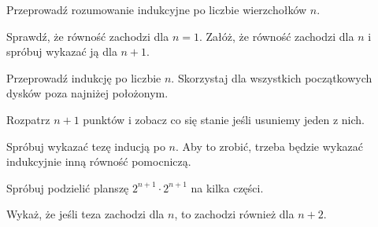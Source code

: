 \newpage
{}

\begin{hints_list}
	\item Przeprowadź rozumowanie indukcyjne po liczbie wierzchołków $n$.

	\item Sprawdź, że równość zachodzi dla $n = 1$. Załóż, że równość zachodzi dla $n$ i spróbuj wykazać ją dla $n + 1$.

	\item Przeprowadź indukcję po liczbie $n$. Skorzystaj dla wszystkich początkowych dysków poza najniżej położonym.

	\item Rozpatrz $n + 1$ punktów i zobacz co się stanie jeśli usuniemy jeden z nich.

	\item Spróbuj wykazać tezę inducją po $n$. Aby to zrobić, trzeba będzie wykazać indukcyjnie inną równość pomocniczą.

	\item Spróbuj podzielić planszę $2^{n + 1} \cdot 2^{n + 1}$ na kilka części.

	\item Wykaż, że jeśli teza zachodzi dla $n$, to zachodzi również dla $n + 2$.
\end{hints_list}